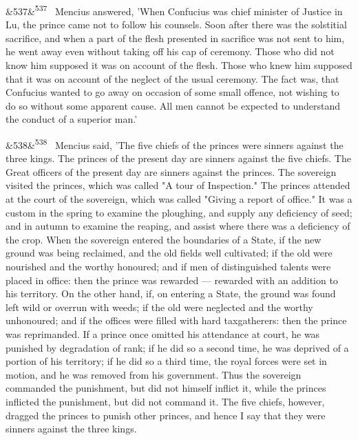 \documentclass[12pt]{article}
\newcommand{\para}[1][]{\par\noindent\ifx&#1&\else\textsuperscript{\footnotesize #1}~\fi}
\begin{document}
\para[537] Mencius answered, 'When Confucius was chief minister of Justice in Lu, the prince came not to follow his counsels. Soon after there was the solstitial sacrifice, and when a part of the flesh presented in sacrifice was not sent to him, he went away even without taking off his cap of ceremony. Those who did not know him supposed it was on account of the flesh. Those who knew him supposed that it was on account of the neglect of the usual ceremony. The fact was, that Confucius wanted to go away on occasion of some small offence, not wishing to do so without some apparent cause. All men cannot be expected to understand the conduct of a superior man.'

\para[538] Mencius said, 'The five chiefs of the princes were sinners against the three kings. The princes of the present day are sinners against the five chiefs. The Great officers of the present day are sinners against the princes. The sovereign visited the princes, which was called "A tour of Inspection." The princes attended at the court of the sovereign, which was called "Giving a report of office." It was a custom in the spring to examine the ploughing, and supply any deficiency of seed; and in autumn to examine the reaping, and assist where there was a deficiency of the crop. When the sovereign entered the boundaries of a State, if the new ground was being reclaimed, and the old fields well cultivated; if the old were nourished and the worthy honoured; and if men of distinguished talents were placed in office: then the prince was rewarded --- rewarded with an addition to his territory. On the other hand, if, on entering a State, the ground was found left wild or overrun with weeds; if the old were neglected and the worthy unhonoured; and if the offices were filled with hard taxgatherers: then the prince was reprimanded. If a prince once omitted his attendance at court, he was punished by degradation of rank; if he did so a second time, he was deprived of a portion of his territory; if he did so a third time, the royal forces were set in motion, and he was removed from his government. Thus the sovereign commanded the punishment, but did not himself inflict it, while the princes inflicted the punishment, but did not command it. The five chiefs, however, dragged the princes to punish other princes, and hence I say that they were sinners against the three kings.
\end{document}
